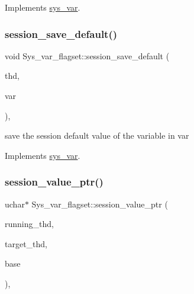 Implements \mbox{\hyperlink{classsys__var}{sys\+\_\+var}}.

\mbox{\label{classSys__var__flagset_aeaad3a960202b38720fe10cbc76cf6d6}} 
\subsubsection{\texorpdfstring{session\+\_\+save\+\_\+default()}{session\_save\_default()}}
{\footnotesize\ttfamily void Sys\+\_\+var\+\_\+flagset\+::session\+\_\+save\+\_\+default (\begin{DoxyParamCaption}\item[{T\+HD $\ast$}]{thd,  }\item[{\mbox{\hyperlink{classset__var}{set\+\_\+var}} $\ast$}]{var }\end{DoxyParamCaption})\hspace{0.3cm}{\ttfamily [inline]}, {\ttfamily [virtual]}}

save the session default value of the variable in var 

Implements \mbox{\hyperlink{classsys__var}{sys\+\_\+var}}.

\mbox{\label{classSys__var__flagset_aa48182db7ffa24ededa4cbd3fdbe8229}} 
\subsubsection{\texorpdfstring{session\+\_\+value\+\_\+ptr()}{session\_value\_ptr()}}
{\footnotesize\ttfamily uchar$\ast$ Sys\+\_\+var\+\_\+flagset\+::session\+\_\+value\+\_\+ptr (\begin{DoxyParamCaption}\item[{T\+HD $\ast$}]{running\+\_\+thd,  }\item[{T\+HD $\ast$}]{target\+\_\+thd,  }\item[{L\+E\+X\+\_\+\+S\+T\+R\+I\+NG $\ast$}]{base }\end{DoxyParamCaption})\hspace{0.3cm}{\ttfamily [inline]}, {\ttfamily [virtual]}}

